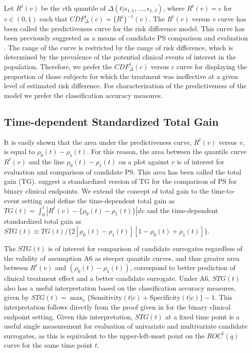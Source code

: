 \documentclass[times, doublespace]{simauth}
\begin{document}
Let $R^t(v)$ be the $v$th quantile of $\Delta(t|s_{1,1}, \dots, s_{1,J})$, where $R^t(v)=c$ for $v\in(0,1)$ such that $CDF^{t}_{\Delta}(c)=\{R^t\}^{-1}(v)$. The $R^t(v)$ versus $v$ curve has been called the predictiveness curve for the risk difference model. This curve has been previously suggested as a means of candidate PS comparison and evaluation \citep{Gilbert08}. The range of the curve is restricted by the range of risk difference, which is determined by the prevalence of the potential clinical events of interest in the population. Therefore, we prefer the $CDF^{t}_{\Delta}(c)$ versus $c$ curve for displaying the proportion of those subjects for which the treatment was ineffective at a given level of estimated risk difference. For characterization of the predictiveness of the model we prefer the classification accuracy measures.

\subsection{Time-dependent Standardized Total Gain} \label{STG}
It is easily shown that the area under the predictiveness curve, $R^t(v)$ versus $v$, is equal to $\rho_0(t)-\rho_1(t)$. For this reason, the area between the quantile curve $R^t(v)$ and the line $\rho_0(t)-\rho_1(t)$ on a plot against $v$ is of interest for evaluation and comparison of candidate PS. This area has been called the total gain (TG). \citet{Huang11} suggest a standardized version of TG for the comparison of PS for binary clinical endpoints. We extend the concept of total gain to the time-to-event setting and define the time-dependent total gain as $TG(t) = \int_0^{1}{|R^t(v) -\{\rho_0(t) -\rho_1(t)\}|dv}$ and the time-dependent standardized total gain as $STG(t) \equiv TG(t)/\{2[\rho_0(t) - \rho_1(t)][1-\rho_0(t) + \rho_1(t)]\}$.

The $STG(t)$ is of interest for comparison of candidate surrogates regardless of the validity of assumption A6 as steeper quantile curves, and thus greater area between $R^t(v)$ and $(\rho_0(t) -\rho_1(t))$, correspond to better prediction of clinical treatment effect and a better candidate surrogate. Under A6, $STG(t)$ also has a useful interpretation based on the classification accuracy measures, given by $STG(t)=\max_c\{\mbox{Sensitivity}(t|c) + \mbox{Specificity}(t|c)\} -1$. This interpretation follows directly from the proof given in \citet{Huang11} for the binary clinical endpoint setting. Given this interpretation, $STG(t)$ at a fixed time point is a useful single measurement for evaluation of univariate and multivariate candidate surrogates, as this is equivalent to the upper-left-most point on the $ROC^{t}(q)$ curve for the same time point $t$.
\end{document}
